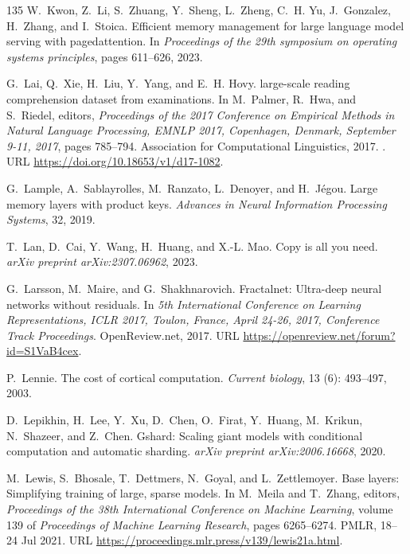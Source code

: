\begin{thebibliography}{135}
W.~Kwon, Z.~Li, S.~Zhuang, Y.~Sheng, L.~Zheng, C.~H. Yu, J.~Gonzalez, H.~Zhang,
  and I.~Stoica.
\newblock Efficient memory management for large language model serving with
  pagedattention.
\newblock In \emph{Proceedings of the 29th symposium on operating systems
  principles}, pages 611--626, 2023.

G.~Lai, Q.~Xie, H.~Liu, Y.~Yang, and E.~H. Hovy.
 large-scale reading comprehension dataset from examinations.
\newblock In M.~Palmer, R.~Hwa, and S.~Riedel, editors, \emph{Proceedings of
  the 2017 Conference on Empirical Methods in Natural Language Processing,
  {EMNLP} 2017, Copenhagen, Denmark, September 9-11, 2017}, pages 785--794.
  Association for Computational Linguistics, 2017.
\newblock {}.
\newblock URL \url{https://doi.org/10.18653/v1/d17-1082}.

G.~Lample, A.~Sablayrolles, M.~Ranzato, L.~Denoyer, and H.~J{\'e}gou.
\newblock Large memory layers with product keys.
\newblock \emph{Advances in Neural Information Processing Systems}, 32, 2019.

T.~Lan, D.~Cai, Y.~Wang, H.~Huang, and X.-L. Mao.
\newblock Copy is all you need.
\newblock \emph{arXiv preprint arXiv:2307.06962}, 2023.

G.~Larsson, M.~Maire, and G.~Shakhnarovich.
\newblock Fractalnet: Ultra-deep neural networks without residuals.
\newblock In \emph{5th International Conference on Learning Representations,
  {ICLR} 2017, Toulon, France, April 24-26, 2017, Conference Track
  Proceedings}. OpenReview.net, 2017.
\newblock URL \url{https://openreview.net/forum?id=S1VaB4cex}.

P.~Lennie.
\newblock The cost of cortical computation.
\newblock \emph{Current biology}, 13 (6): 493--497, 2003.

D.~Lepikhin, H.~Lee, Y.~Xu, D.~Chen, O.~Firat, Y.~Huang, M.~Krikun, N.~Shazeer,
  and Z.~Chen.
\newblock Gshard: Scaling giant models with conditional computation and
  automatic sharding.
\newblock \emph{arXiv preprint arXiv:2006.16668}, 2020.

M.~Lewis, S.~Bhosale, T.~Dettmers, N.~Goyal, and L.~Zettlemoyer.
\newblock Base layers: Simplifying training of large, sparse models.
\newblock In M.~Meila and T.~Zhang, editors, \emph{Proceedings of the 38th
  International Conference on Machine Learning}, volume 139 of
  \emph{Proceedings of Machine Learning Research}, pages 6265--6274. PMLR,
  18--24 Jul 2021.
\newblock URL \url{https://proceedings.mlr.press/v139/lewis21a.html}.


\end{thebibliography}
